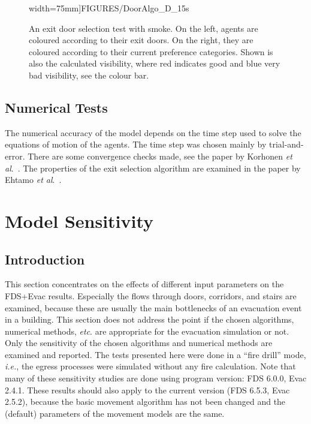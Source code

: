 \documentclass[12pt,a4paper,final,twoside]{stylevk}
\begin{document}
\begin{enumerate}
\begin{figure}[!tb]
{  width=75mm]{FIGURES/DoorAlgo_D_15s}}  
  \caption{An exit door selection test with smoke.  On the left,
    agents are coloured according to their exit doors. On the right,
    they are coloured according to their current preference
    categories.  Shown is also the calculated visibility, where red
    indicates good and blue very bad visibility, see the colour
    bar.}\label{Fig_ExitDoorSmoke}
\end{figure}
%
%
\end{enumerate}
%


\section{Numerical Tests}\label{Sec_NumTest}

\noindent The numerical accuracy of the model depends on the time step
used to solve the equations of motion of the agents.  The time step
was chosen mainly by trial-and-error.  There are some convergence
checks made, see the paper by Korhonen \emph{et
  al}.~\cite{Korhonen08b}.  The properties of the exit selection
algorithm are examined in the paper by Ehtamo \emph{et
  al}.~\cite{Ehtamo2010}.

\clearpage

\newpage


\chapter{Model Sensitivity}\label{Sec_ModelSensi}


\section{Introduction}

\noindent This section concentrates on the effects of different input
parameters on the FDS+Evac results.  Especially the flows through
doors, corridors, and stairs are examined, because these are usually
the main bottlenecks of an evacuation event in a building.  This
section does not address the point if the chosen algorithms, numerical
methods, \emph{etc}.  are appropriate for the evacuation simulation or
not.  Only the sensitivity of the chosen algorithms and numerical
methods are examined and reported.  The tests presented here were done
in a ``fire drill'' mode, \emph{i.e.}, the egress processes were
simulated without any fire calculation.  Note that many of these
sensitivity studies are done using program version: FDS 6.0.0, Evac
2.4.1.  These results should also apply to the current version (FDS
6.5.3, Evac 2.5.2), because the basic movement algorithm has not been
changed and the (default) parameters of the movement models are the
same.
\end{document}
